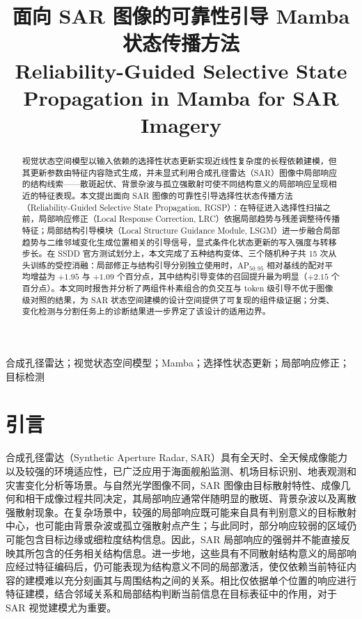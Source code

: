 \documentclass[journal]{IEEEtran}
\title{\LARGE 面向 SAR 图像的可靠性引导 Mamba 状态传播方法\\[0.5em]
{\large Reliability-Guided Selective State Propagation in Mamba for SAR Imagery}}
\author{}
\begin{document}
\maketitle
\begin{abstract}
视觉状态空间模型以输入依赖的选择性状态更新实现近线性复杂度的长程依赖建模，但其更新参数由特征内容隐式生成，并未显式利用合成孔径雷达（SAR）图像中局部响应的结构线索——散斑起伏、背景杂波与孤立强散射可使不同结构意义的局部响应呈现相近的特征表现。本文提出面向 SAR 图像的可靠性引导选择性状态传播方法（Reliability-Guided Selective State Propagation, RGSP）：在特征进入选择性扫描之前，局部响应修正（Local Response Correction, LRC）依据局部趋势与残差调整待传播特征；局部结构引导模块（Local Structure Guidance Module, LSGM）进一步融合局部趋势与二维邻域变化生成位置相关的引导信号，显式条件化状态更新的写入强度与转移步长。在 SSDD 官方测试划分上，本文完成了五种结构变体、三个随机种子共 15 次从头训练的受控消融：局部修正与结构引导分别独立使用时，AP$_{50:95}$ 相对基线的配对平均增益为 $+1.95$ 与 $+1.09$ 个百分点，其中结构引导变体的召回提升最为明显（$+2.15$ 个百分点）。本文同时报告并分析了两组件朴素组合的负交互与 token 级引导不优于图像级对照的结果，为 SAR 状态空间建模的设计空间提供了可复现的组件级证据；分类、变化检测与分割任务上的诊断结果进一步界定了该设计的适用边界。
\end{abstract}
\begin{IEEEkeywords}合成孔径雷达；视觉状态空间模型；Mamba；选择性状态更新；局部响应修正；目标检测
\end{IEEEkeywords}

\section{引言}\label{sec:intro}

合成孔径雷达（Synthetic Aperture Radar, SAR）具有全天时、全天候成像能力以及较强的环境适应性，已广泛应用于海面舰船监测、机场目标识别、地表观测和灾害变化分析等场景。与自然光学图像不同，SAR 图像由目标散射特性、成像几何和相干成像过程共同决定，其局部响应通常伴随明显的散斑、背景杂波以及离散强散射现象。在复杂场景中，较强的局部响应既可能来自具有判别意义的目标散射中心，也可能由背景杂波或孤立强散射点产生；与此同时，部分响应较弱的区域仍可能包含目标边缘或细粒度结构信息。因此，SAR 局部响应的强弱并不能直接反映其所包含的任务相关结构信息。进一步地，这些具有不同散射结构意义的局部响应经过特征编码后，仍可能表现为结构意义不同的局部激活，使仅依赖当前特征内容的建模难以充分刻画其与周围结构之间的关系。相比仅依据单个位置的响应进行特征建模，结合邻域关系和局部结构判断当前信息在目标表征中的作用，对于 SAR 视觉建模尤为重要。
\end{document}
